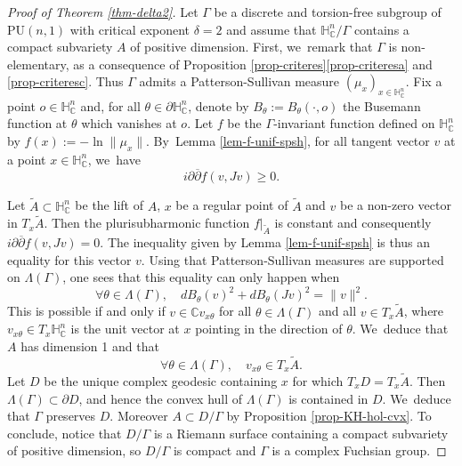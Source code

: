 \documentclass[JEP,XML,SOM,Unicode,NoEqCountersInSection,published]{cedram}
\theoremstyle{definition}
\newcommand{\C}{\mathbb{C}}
\newcommand{\HNC}{\mathbb{H}^{n}_{\C}}
\newcommand{\PHNC}{\partial\mathbb{H}^{n}_{\C}}
\newcommand{\PU}{\mathrm{PU}}
\def\C{\mathbb{C}}
\newcommand{\HNC}{\mathbb{H}^{n}_{\C}}
\newcommand{\PU}{\mathrm{PU}}
\begin{document}
\begin{proof}[Proof of Theorem \ref{thm-delta2}]
Let $\Gamma$ be a discrete and torsion-free subgroup of $\PU(n,1)$ with critical exponent $\delta=2$ and assume that $\HNC/\Gamma$ contains a compact subvariety $A$ of positive dimension.
First, we~remark that $\Gamma$ is non-elementary, as a consequence of Proposition \ref{prop-criteres}\eqref{prop-criteresa} and \eqref{prop-criteresc}. Thus $\Gamma$ admits a Patterson-Sullivan measure $(\mu_x)_{x\in \HNC}$. Fix a point $o\in \HNC$ and, for all $\theta\in \PHNC$, denote by $B_\theta:=B_{\theta}(\cdot,o)$ the Busemann function at $\theta$ which vanishes at $o$. Let ${f}$ be the $\Gamma$\nobreakdash-invariant function defined on $\HNC$ by $f(x):=-\ln \lVert \mu_x\rVert$. By~Lemma \ref{lem-f-unif-spsh}, for all tangent vector $v$ at a point $x\in \HNC$, we~have
\begin{equation*}
i\partial\overline{\partial}{f}(v,Jv) \ge 0.
\end{equation*}

Let $\widetilde{A}\subset \HNC$ be the lift of $A$, $x$ be a regular point of $\widetilde{A}$ and $v$ be a non-zero vector in $T_x\widetilde{A}$. Then the plurisubharmonic function ${f}\vert_{ \widetilde{A}}$ is constant and consequently $i\partial\overline{\partial}{f}(v,Jv) = 0$.
The inequality given by Lemma \ref{lem-f-unif-spsh} is thus an equality for this vector $v$. Using that Patterson-Sullivan measures are supported on $\Lambda(\Gamma)$, one sees that this equality can only happen when
\begin{equation*}
\forall \theta\in \Lambda(\Gamma),\quad dB_{\theta}(v)^{2}+dB_{\theta}(Jv)^{2} = \lVert v\rVert^{2}.
\end{equation*}
This is possible if and only if $v\in \C v_{x\theta}$ for all $\theta\in \Lambda(\Gamma)$ and all $v\in T_x\widetilde{A}$, where $v_{x\theta} \in T_x\HNC$ is the unit vector at $x$ pointing in the direction of $\theta$. We~deduce that $A$ has dimension 1 and that
\begin{equation*}
\forall \theta\in \Lambda(\Gamma),\quad v_{x\theta}\in T_x\widetilde{A}.
\end{equation*}
Let $D$ be the unique complex geodesic containing $x$ for which $T_xD=T_x\widetilde{A}$. Then $\Lambda(\Gamma)\subset \partial D$, and hence the convex hull of $\Lambda(\Gamma)$ is contained in $D$. We~deduce that $\Gamma$ preserves $D$. Moreover $A\subset D/\Gamma$ by Proposition \ref{prop-KH-hol-cvx}. To conclude, notice that $D/\Gamma$ is a Riemann surface containing a compact subvariety of positive dimension, so $D/\Gamma$ is compact and $\Gamma$ is a complex Fuchsian group.
\end{proof}
\end{document}
